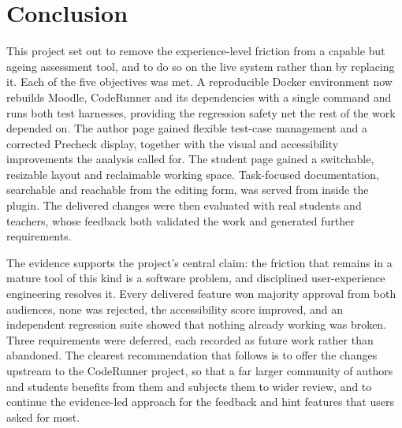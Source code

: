\section{Conclusion}\label{conc}

This project set out to remove the experience-level friction from a capable but ageing assessment tool, and to do so on the live system rather than by replacing it. Each of the five objectives was met. A reproducible Docker environment now rebuilds Moodle, CodeRunner and its dependencies with a single command and runs both test harnesses, providing the regression safety net the rest of the work depended on. The author page gained flexible test-case management and a corrected Precheck display, together with the visual and accessibility improvements the analysis called for. The student page gained a switchable, resizable layout and reclaimable working space. Task-focused documentation, searchable and reachable from the editing form, was served from inside the plugin. The delivered changes were then evaluated with real students and teachers, whose feedback both validated the work and generated further requirements.

The evidence supports the project's central claim: the friction that remains in a mature tool of this kind is a software problem, and disciplined user-experience engineering resolves it. Every delivered feature won majority approval from both audiences, none was rejected, the accessibility score improved, and an independent regression suite showed that nothing already working was broken. Three requirements were deferred, each recorded as future work rather than abandoned. The clearest recommendation that follows is to offer the changes upstream to the CodeRunner project, so that a far larger community of authors and students benefits from them and subjects them to wider review, and to continue the evidence-led approach for the feedback and hint features that users asked for most.


